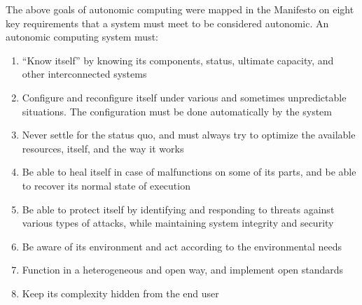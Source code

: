 The above goals of autonomic computing were mapped in the Manifesto \cite{IBM:AutonomicManifesto} on eight key requirements that a system must meet to be considered autonomic. An autonomic computing system must:

\begin{enumerate}
	\item ``Know itself'' by knowing its components, status, ultimate capacity, and other interconnected systems
	\item Configure and reconfigure itself under various and sometimes unpredictable situations. The configuration must be done automatically by the system
	\item Never settle for the status quo, and must always try to optimize the available resources, itself, and the way it works
	\item Be able to heal itself in case of malfunctions on some of its parts, and be able to recover its normal state of execution
	\item Be able to protect itself by identifying and responding to threats against various types of attacks, while maintaining system integrity and security
	\item Be aware of its environment and act according to the environmental needs
	\item Function in a heterogeneous and open way, and implement open standards
	\item Keep its complexity hidden from the end user
\end{enumerate}

